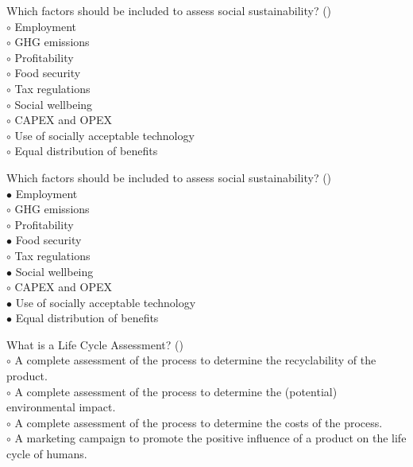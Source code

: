 \documentclass[]{beamer}
\begin{document}
\begin{CJK}{UTF8}{gbsn}
\begin{frame}[shrink] {}
\addtocounter{questions}{1}
\color{blue}
Which factors should be included to assess social sustainability?
({})\\
\color{black}
\setlength{\parindent}{-0.4cm}
{\color{red}$\circ$}  Employment  \\
{\color{red}$\circ$} GHG emissions  \\
{\color{red}$\circ$} Profitability  \\
{\color{red}$\circ$}  Food security  \\
{\color{red}$\circ$} Tax regulations  \\
{\color{red}$\circ$}  Social wellbeing  \\
{\color{red}$\circ$} CAPEX and OPEX  \\
{\color{red}$\circ$}  Use of socially acceptable technology  \\
{\color{red}$\circ$}  Equal distribution of benefits  \\
\end{frame}
\begin{frame}[shrink] {}
\addtocounter{answers}{1}
\color{blue}
Which factors should be included to assess social sustainability?
({})\\
\color{black}
\setlength{\parindent}{-0.4cm}
{\color{red}$\bullet$} Employment  \\
{\color{red}$\circ$} GHG emissions  \\
{\color{red}$\circ$} Profitability  \\
{\color{red}$\bullet$} Food security  \\
{\color{red}$\circ$} Tax regulations  \\
{\color{red}$\bullet$} Social wellbeing  \\
{\color{red}$\circ$} CAPEX and OPEX  \\
{\color{red}$\bullet$} Use of socially acceptable technology  \\
{\color{red}$\bullet$} Equal distribution of benefits  \\
\end{frame}


\begin{frame}[shrink] {}
\addtocounter{questions}{1}
\color{blue}
What is a Life Cycle Assessment?
({})\\
\color{black}
\setlength{\parindent}{-0.4cm}
{\color{red}$\circ$} A complete assessment of the process to determine the recyclability of the product.  \\
{\color{red}$\circ$}  A complete assessment of the process to determine the (potential) environmental impact.  \\
{\color{red}$\circ$} A complete assessment of the process to determine the costs of the process.  \\
{\color{red}$\circ$} A marketing campaign to promote the positive influence of a product on the life cycle of humans.  \\


\end{frame}
\end{CJK}
\end{document}
